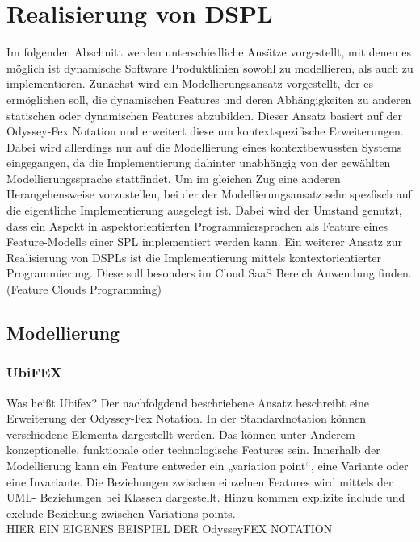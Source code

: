 \documentclass{sig-alternate-05-2015}
\begin{document}
\section{Realisierung von DSPL}
Im folgenden Abschnitt werden unterschiedliche Ansätze vorgestellt, mit denen es möglich ist dynamische Software Produktlinien sowohl zu modellieren, als auch zu implementieren. 
Zunächst wird ein Modellierungsansatz vorgestellt, der es ermöglichen soll, die dynamischen Features und deren Abhängigkeiten zu anderen statischen oder dynamischen Features abzubilden. 
Dieser Ansatz basiert auf der Odyssey-Fex Notation und erweitert diese um kontextspezifische Erweiterungen. 
Dabei wird allerdings nur auf die Modellierung eines kontextbewussten Systems eingegangen, da die Implementierung dahinter unabhängig von der gewählten Modellierungssprache stattfindet. 
Um im gleichen Zug eine anderen Herangehensweise vorzustellen, bei der der Modellierungsansatz sehr spezfisch auf die eigentliche Implementierung ausgelegt ist. 
Dabei wird der Umstand genutzt, dass ein Aspekt in aspektorientierten Programmiersprachen als Feature eines Feature-Modells einer SPL implementiert werden kann. 
Ein weiterer Ansatz zur Realisierung von DSPLs ist die Implementierung mittels kontextorientierter Programmierung. 
Diese soll besonders im Cloud SaaS Bereich Anwendung finden. (Feature Clouds Programming) \\

\subsection{Modellierung}

\subsubsection{UbiFEX}
Was heißt Ubifex?
Der nachfolgdend beschriebene Ansatz beschreibt eine Erweiterung der Odyssey-Fex Notation. 
In der Standardnotation können verschiedene Elementa dargestellt werden. 
Das können unter Anderem konzeptionelle, funktionale oder technologische Features sein. 
Innerhalb der Modellierung kann ein Feature entweder ein „variation point“, eine Variante oder eine Invariante. 
Die Beziehungen zwischen einzelnen Features wird mittels der UML- Beziehungen bei Klassen dargestellt. 
Hinzu kommen explizite include und exclude Beziehung zwischen Variations points. \\

HIER EIN EIGENES BEISPIEL DER OdysseyFEX NOTATION
\end{document}
